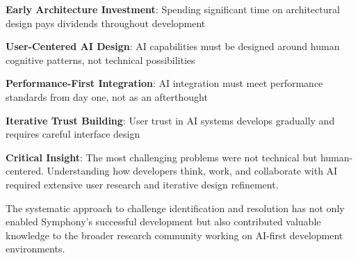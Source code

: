 \begin{expandedlist}
    \item \textbf{Early Architecture Investment}: Spending significant time on architectural design pays dividends throughout development
    \item \textbf{User-Centered AI Design}: AI capabilities must be designed around human cognitive patterns, not technical possibilities
    \item \textbf{Performance-First Integration}: AI integration must meet performance standards from day one, not as an afterthought
    \item \textbf{Iterative Trust Building}: User trust in AI systems develops gradually and requires careful interface design
\end{expandedlist}

\begin{alertbox}
\textbf{Critical Insight}: The most challenging problems were not technical but human-centered. Understanding how developers think, work, and collaborate with AI required extensive user research and iterative design refinement.
\end{alertbox}

The systematic approach to challenge identification and resolution has not only enabled Symphony's successful development but also contributed valuable knowledge to the broader research community working on AI-first development environments.